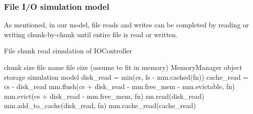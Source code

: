 \documentclass[conference]{IEEEtran}
\newcommand{\Desc}[2]{\State \makebox[2em][l]{#1}#2}
\begin{document}
            \subsubsection{File I/O simulation model}
             
            As mentioned, in our model, file reads and writes can be completed by 
            reading or writing chunk-by-chunk until entire file is read or written.
            
            \begin{algorithm}\caption{File chunk read simulation of IOController}
            \label{alg:read}
                \small
                \begin{algorithmic}[1]
                    \Input
                        \Desc{cs}{chunk size}
                        \Desc{fn}{file name}
                        \Desc{fs}{file size (assume to fit in memory)}
                        \Desc{mm}{MemoryManager object}
                        \Desc{sm}{storage simulation model}
                       \EndInput
                       \State disk\_read = min(cs, fs - mm.cached(fn))
                       \State cache\_read = cs - disk\_read
                    \State mm.flush(cs + disk\_read - mm.free\_mem - mm.evictable, fn) 
                    \State mm.evict(cs + disk\_read - mm.free\_mem, fn) 
                          
                        \State sm.read(disk\_read)  
                        \State mm.add\_to\_cache(disk\_read, fn)     
                    \EndIf
                     
                        \State mm.cache\_read(cache\_read)  
                    \EndIf
                \end{algorithmic}
            \end{algorithm}            
\end{document}
